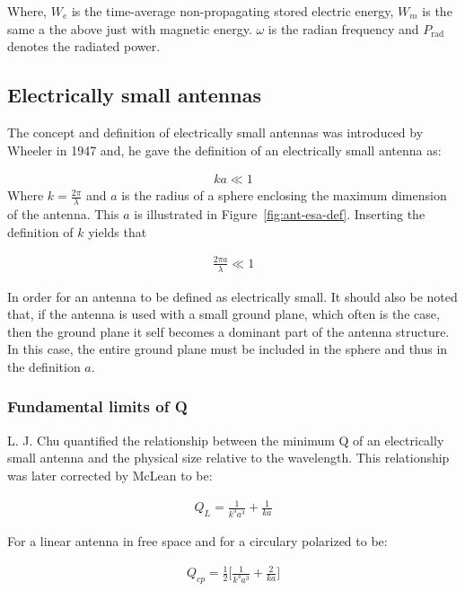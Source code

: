 Where, $W_e$ is the time-average non-propagating stored electric energy, $W_m$ is the same a the above just with magnetic energy. $\omega$ is the radian frequency and $P_{\text{rad}}$ denotes the radiated power.

\subsection{Electrically small antennas}
The concept and definition of electrically small antennas was introduced by Wheeler in 1947 and, he gave the definition of an electrically small antenna as:

\begin{align}
\label{eq:esa-def}
  ka \ll 1 
\end{align}
Where $k = \frac{2\pi}{\lambda}$ and $a$ is the radius of a sphere enclosing the maximum dimension of the antenna. This $a$ is illustrated in Figure~\ref{fig:ant-esa-def}. Inserting the definition of $k$ yields that

\begin{align}
  \frac{2\pi a}{\lambda} \ll 1
\end{align}

In order for an antenna to be defined as electrically small. It should also be noted that, if the antenna is used with a small ground plane, which often is the case, then the ground plane it self becomes a dominant part of the antenna structure. In this case, the entire ground plane must be included in the sphere and thus in the definition $a$. 


\subsubsection{Fundamental limits of Q}
L. J. Chu quantified the relationship between the minimum Q of an electrically small antenna and the physical size relative to the wavelength. This relationship was later corrected by McLean to be:  

\begin{align}
  Q_L = \frac{1}{k^3a^3}+ \frac{1}{ka}
\end{align}

For a linear antenna in free space and for a circulary polarized to be: 

\begin{align}
  Q_{cp} = \frac{1}{2} \Big[ \frac{1}{k^3a^3} + \frac{2}{ka} \Big]
\end{align}


